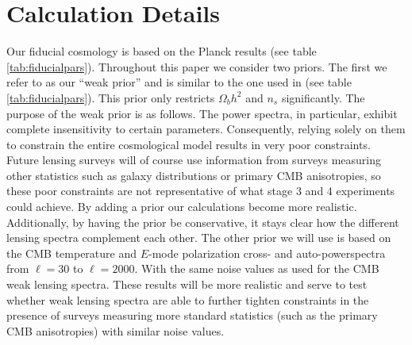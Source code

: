 \documentclass[11pt]{article} %
\begin{document}
\section{Calculation Details}\label{sec:calcdetails}
Our fiducial cosmology is based on the Planck results \cite{planckresults} (see table \ref{tab:fiducialpars}). Throughout this paper we consider two priors. The first we refer to as our ``weak prior'' and is similar to the one used in \cite{Planck2018Lensing} (see table \ref{tab:fiducialpars}). This prior only restricts $\Omega_b h^2$ and $n_s$ significantly. The purpose of the weak prior is as follows. The power spectra, in particular, exhibit complete insensitivity to certain parameters. Consequently, relying solely on them to constrain the entire cosmological model results in very poor constraints. Future lensing surveys will of course use information from surveys measuring other statistics such as galaxy distributions or primary CMB anisotropies, so these poor constraints are not representative of what stage 3 and 4 experiments could achieve. By adding a prior our calculations become more realistic. Additionally, by having the prior be conservative, it stays clear how the different lensing spectra complement each other. The other prior we will use is based on the CMB temperature and $E$-mode polarization cross- and auto-powerspectra from $\ell=30$ to $\ell = 2000$. With the same noise values as used for the CMB weak lensing spectra. These results will be more realistic and serve to test whether weak lensing spectra are able to further tighten constraints in the presence of surveys measuring more standard statistics (such as the primary CMB anisotropies) with similar noise values.
\end{document}
